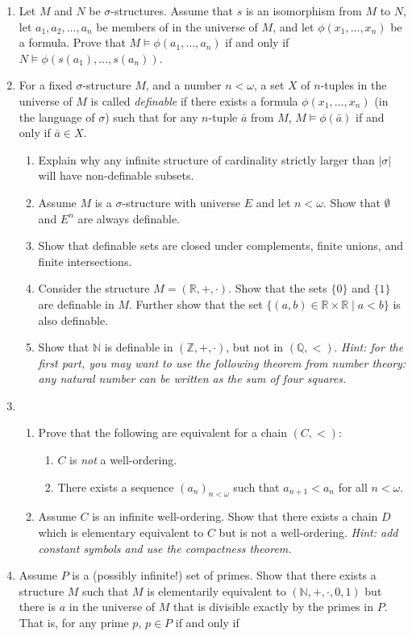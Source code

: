 \documentclass{amsart}
\theoremstyle{definition}
\newcommand{\ba}{\bar{a}}
\begin{document}
\begin{enumerate}
\item Let $M$ and $N$ be $\sigma$-structures. Assume that $s$ is an isomorphism from $M$ to $N$, let $a_1, a_2, \ldots, a_n$ be members of in the universe of $M$, and let $\phi (x_1, \ldots, x_n)$ be a formula. Prove that $M \models \phi (a_1, \ldots, a_n)$ if and only if $N \models \phi (s (a_1), \ldots, s (a_n))$.
\item For a fixed $\sigma$-structure $M$, and a number $n < \omega$, a set $X$ of $n$-tuples in the universe of $M$ is called \emph{definable} if there exists a formula $\phi (x_1, \ldots, x_n)$ (in the language of $\sigma$) such that for any $n$-tuple $\ba$ from $M$, $M \models \phi (\ba)$ if and only if $\ba \in X$.

  \begin{enumerate}
  \item Explain why any infinite structure of cardinality strictly larger than $|\sigma|$  will have non-definable subsets.
  \item Assume $M$ is a $\sigma$-structure with universe $E$ and let $n < \omega$. Show that $\emptyset$ and $E^n$ are always definable.
  \item Show that definable sets are closed under complements, finite unions, and finite intersections. 
  \item Consider the structure $M = (\mathbb{R}, +, \cdot)$. Show that the sets $\{0\}$ and $\{1\}$ are definable in $M$. Further show that the set $\{(a, b) \in \mathbb{R} \times \mathbb{R} \mid a < b\}$ is also definable.
  \item Show that $\mathbb{N}$ is definable in $(\mathbb{Z}, +, \cdot)$, but not in $(\mathbb{Q}, <)$. \emph{Hint: for the first part, you may want to use the following theorem from number theory: any natural number can be written as the sum of four squares.}
  \end{enumerate}

\item \begin{enumerate}

\item Prove that the following are equivalent for a chain $(C, <)$:
  \begin{enumerate}
  \item $C$ is \emph{not} a well-ordering.
  \item There exists a sequence $(a_n)_{n < \omega}$ such that $a_{n + 1} < a_n$ for all $n < \omega$.
  \end{enumerate}
\item Assume $C$ is an infinite well-ordering. Show that there exists a chain $D$ which is elementary equivalent to $C$ but is not a well-ordering. \emph{Hint: add constant symbols and use the compactness theorem.}
\end{enumerate}
\item Assume $P$ is a (possibly infinite!) set of primes. Show that there exists a structure $M$ such that $M$ is elementarily equivalent to $(\mathbb{N}, +, \cdot, 0, 1)$ but there is $a$ in the universe of $M$ that is divisible exactly by the primes in $P$. That is, for any prime $p$, $p \in P$ if and only if


\end{enumerate}
\end{document}
